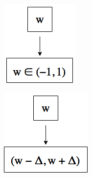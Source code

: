 \begin{figure}[H]
	\centering
	\begin{subfigure}{0.3\textwidth}
		\label{fig:mutation-random}
		\centering
		\includegraphics[height=\linewidth]{chapters/res/mutation_random.png}
		\caption{}
	\end{subfigure}
	\begin{subfigure}{0.3\textwidth}
		\label{fig:mutation-incremental}
		\centering
		\includegraphics[height=\linewidth]{chapters/res/mutation_incremental.png}
		\caption{}
	\end{subfigure}
	\caption{ }
	\label{fig:mutation-operators}
\end{figure}


